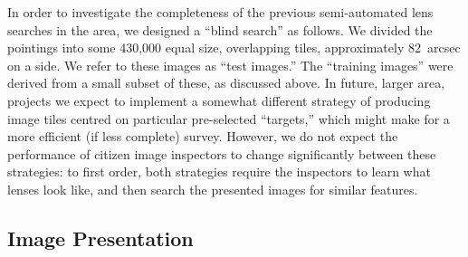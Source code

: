 \documentclass[useAMS,usenatbib,a4paper]{mn2e}
\begin{document}
In order to investigate the completeness of the previous semi-automated lens
searches in the \cfhtls area, we designed a ``blind search'' as follows.
We divided the
\cfhtls pointings into some 430,000 equal size, overlapping tiles, approximately
82~arcsec on a side. We refer to these images as ``test images.'' The ``training
images'' were derived from a small subset of these, as  discussed above. In
future, larger area, projects we expect to implement a somewhat different
strategy of producing image tiles centred on particular pre-selected
``targets,'' which might make for a more efficient (if less complete) survey.
However, we do not expect the performance of citizen image inspectors to change
significantly between these strategies: to first order, both strategies require
the inspectors to learn what lenses look like, and then search the presented
images for similar features.



\subsection{Image Presentation}
\label{sec:data:display}
\end{document}
